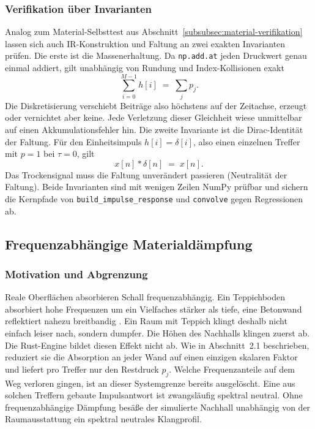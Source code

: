 \subsubsection{Verifikation über Invarianten}
\label{subsubsec:faltung-verifikation}

Analog zum Material-Selbsttest aus
Abschnitt~\ref{subsubsec:material-verifikation} lassen sich auch
IR-Konstruktion und Faltung an zwei exakten Invarianten prüfen. Die erste ist
die Massenerhaltung. Da \texttt{np.add.at} jeden Druckwert genau einmal addiert,
gilt unabhängig von Rundung und Index-Kollisionen exakt
\[
    \sum_{i=0}^{M-1} h[i] \;=\; \sum_{j} p_j .
\]
Die Diskretisierung verschiebt Beiträge also höchstens auf der Zeitachse, erzeugt
oder vernichtet aber keine. Jede Verletzung dieser Gleichheit wiese unmittelbar
auf einen Akkumulationsfehler hin. Die zweite Invariante ist die
Dirac-Identität der Faltung. Für den Einheitsimpuls $h[i] = \delta[i]$, also
einen einzelnen Treffer mit $p = 1$ bei $\tau = 0$, gilt
\[
    x[n] * \delta[n] \;=\; x[n].
\]
Das Trockensignal muss die Faltung unverändert passieren (Neutralität der
Faltung). Beide Invarianten sind mit wenigen Zeilen NumPy prüfbar und sichern
die Kernpfade von \texttt{build\_impulse\_response} und \texttt{convolve} gegen
Regressionen ab.

\subsection{Frequenzabhängige Materialdämpfung}
\label{subsec:material}

\subsubsection{Motivation und Abgrenzung}
\label{subsubsec:material-motivation}

Reale Oberflächen absorbieren Schall frequenzabhängig. Ein Teppichboden
absorbiert hohe Frequenzen um ein Vielfaches stärker als tiefe, eine Betonwand
reflektiert nahezu breitbandig \parencite{kuttruff2016}. Ein Raum mit Teppich klingt
deshalb nicht einfach leiser nach, sondern dumpfer. Die Höhen des Nachhalls
klingen zuerst ab. Die Rust-Engine bildet diesen Effekt nicht ab. Wie in
Abschnitt~2.1 beschrieben, reduziert sie die Absorption an jeder Wand auf einen
einzigen skalaren Faktor und liefert pro Treffer nur den Restdruck $p_j$. Welche
Frequenzanteile auf dem Weg verloren gingen, ist an dieser Systemgrenze bereits
ausgelöscht.
Eine aus solchen Treffern gebaute Impulsantwort ist zwangsläufig spektral neutral.
Ohne frequenzabhängige Dämpfung besäße der simulierte Nachhall unabhängig von der Raumausstattung ein spektral neutrales Klangprofil.


